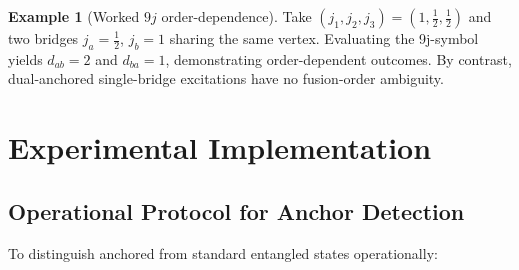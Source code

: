 \documentclass[11pt]{article}
\theoremstyle{plain}
\theoremstyle{definition}
\newtheorem{example}[theorem]{Example}
\begin{document}
\begin{example}[Worked $9j$ order-dependence]
  Take $(j_1,j_2,j_3)=(1,\tfrac12,\tfrac12)$ and two bridges $j_a=\tfrac12$, $j_b=1$ sharing the same vertex. Evaluating the 9j-symbol yields $d_{ab}=2$ and $d_{ba}=1$, demonstrating order-dependent outcomes. By contrast, dual-anchored single-bridge excitations have no fusion-order ambiguity.
\end{example}

\section{Experimental Implementation}
\label{sec:tests}

\subsection{Operational Protocol for Anchor Detection}

To distinguish anchored from standard entangled states operationally:
\end{document}
